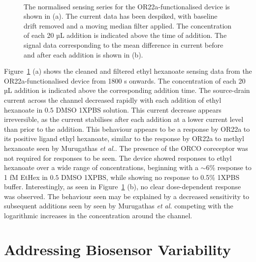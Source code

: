 \documentclass[
  a4paper,
]{scrbook}
\begin{document}
\begin{figure}
\begin{minipage}[t]{0.70\linewidth}
{{}

}

\end{minipage}%
%
\begin{minipage}[t]{0.15\linewidth}

{\centering 

~

}

\end{minipage}%

\caption{\label{fig-OR22a-sensing-series}The normalised sensing series
for the OR22a-functionalised device is shown in (a). The current data
has been despiked, with baseline drift removed and a moving median
filter applied. The concentration of each 20 µL addition is indicated
above the time of addition. The signal data corresponding to the mean
difference in current before and after each addition is shown in (b).}

\end{figure}

Figure~\ref{fig-OR22a-sensing-series} (a) shows the cleaned and filtered
ethyl hexanoate sensing data from the OR22a-functionalised device from
1800 s onwards. The concentration of each 20 µL addition is indicated
above the corresponding addition time. The source-drain current across
the channel decreased rapidly with each addition of ethyl hexanoate in
\(0.5%
\) DMSO 1XPBS solution. This current decrease appears irreversible, as
the current stabilises after each addition at a lower current level than
prior to the addition. This behaviour appears to be a response by OR22a
to its positive ligand ethyl hexanoate, similar to the response by OR22a
to methyl hexanoate seen by Murugathas \emph{et al.}. The presence of
the ORCO coreceptor was not required for responses to be seen. The
device showed responses to ethyl hexanoate over a wide range of
concentrations, beginning with a \(\sim 6\)\% response to 1 fM EtHex in
\(0.5%
\) DMSO 1XPBS, while showing no response to 0.5\% 1XPBS buffer.
Interestingly, as seen in Figure~\ref{fig-OR22a-sensing-series} (b), no
clear dose-dependent response was observed. The behaviour seen may be
explained by a decreased sensitivity to subsequent additions seen by
seen by Murugathas \emph{et al.} \autocite{Murugathas2019b} competing
with the logarithmic increases in the concentration around the channel.

\hypertarget{sec-variability}{%
\section{Addressing Biosensor Variability}\label{sec-variability}}
\end{document}
